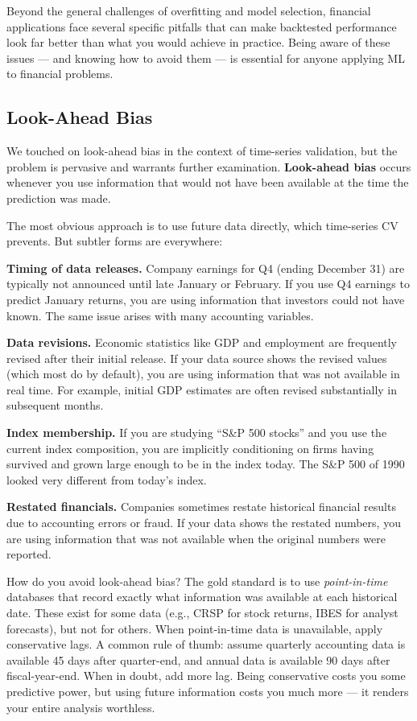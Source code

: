 \documentclass[11pt,a4paper]{article}
\newcommand{\keyword}[1]{\textbf{\textcolor{AccentOrange}{#1}}}
\begin{document}
Beyond the general challenges of overfitting and model selection, financial applications face several specific pitfalls that can make backtested performance look far better than what you would achieve in practice. Being aware of these issues — and knowing how to avoid them — is essential for anyone applying ML to financial problems.

\subsection{Look-Ahead Bias}

We touched on look-ahead bias in the context of time-series validation, but the problem is pervasive and warrants further examination. \keyword{Look-ahead bias} occurs whenever you use information that would not have been available at the time the prediction was made.

The most obvious approach is to use future data directly, which time-series CV prevents. But subtler forms are everywhere:

\textbf{Timing of data releases.} Company earnings for Q4 (ending December 31) are typically not announced until late January or February. If you use Q4 earnings to predict January returns, you are using information that investors could not have known. The same issue arises with many accounting variables.

\textbf{Data revisions.} Economic statistics like GDP and employment are frequently revised after their initial release. If your data source shows the revised values (which most do by default), you are using information that was not available in real time. For example, initial GDP estimates are often revised substantially in subsequent months.

\textbf{Index membership.} If you are studying ``S\&P 500 stocks'' and you use the current index composition, you are implicitly conditioning on firms having survived and grown large enough to be in the index today. The S\&P 500 of 1990 looked very different from today's index.

\textbf{Restated financials.} Companies sometimes restate historical financial results due to accounting errors or fraud. If your data shows the restated numbers, you are using information that was not available when the original numbers were reported.

How do you avoid look-ahead bias? The gold standard is to use \emph{point-in-time} databases that record exactly what information was available at each historical date. These exist for some data (e.g., CRSP for stock returns, IBES for analyst forecasts), but not for others. When point-in-time data is unavailable, apply conservative lags. A common rule of thumb: assume quarterly accounting data is available 45 days after quarter-end, and annual data is available 90 days after fiscal-year-end. When in doubt, add more lag. Being conservative costs you some predictive power, but using future information costs you much more — it renders your entire analysis worthless.
\end{document}
